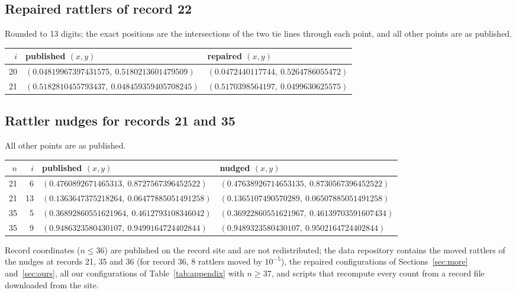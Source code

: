 \documentclass[11pt]{amsart}
\theoremstyle{definition}
\begin{document}
\subsection*{Repaired rattlers of record 22}
Rounded to 13 digits; the exact positions are the intersections of the two tie lines through each point, and all other points are as published. %
\begin{center}\small
\begin{tabular}{@{}rll@{}}
\toprule
$i$ & published $(x,y)$ & repaired $(x,y)$ \\
\midrule
20 & $(0.04819967397431575,\ 0.5180213601479509)$ & $(0.0472440117744,\ 0.5264786055472)$ \\
21 & $(0.5182810455793437,\ 0.048459359405708245)$ & $(0.5170398564197,\ 0.0499630625575)$ \\
\bottomrule
\end{tabular}
\end{center}

\subsection*{Rattler nudges for records 21 and 35}
All other points are as published. %
\begin{center}\small
\begin{tabular}{@{}rrll@{}}
\toprule
$n$ & $i$ & published $(x,y)$ & nudged $(x,y)$ \\
\midrule
21 & 6 & $(0.4760892671465313,\ 0.8727567396452522)$ & $(0.47638926714653135,\ 0.8730567396452522)$ \\
21 & 13 & $(0.1363647375218264,\ 0.06477885051491258)$ & $(0.1365107490570289,\ 0.06507885051491258)$ \\
35 & 5 & $(0.36892860551621964,\ 0.4612793108346042)$ & $(0.36922860551621967,\ 0.46139703591607434)$ \\
35 & 9 & $(0.9486323580430107,\ 0.9499164724402844)$ & $(0.9489323580430107,\ 0.9502164724402844)$ \\
\bottomrule
\end{tabular}
\end{center}
Record coordinates ($n \le 36$) are published on the record site and are not redistributed; the data repository contains the moved rattlers of the nudges at records 21, 35 and 36 (for record 36, 8 rattlers moved by $10^{-5}$), the repaired configurations of Sections~\ref{sec:more} and~\ref{sec:ours}, all our configurations of Table~\ref{tab:appendix} with $n \ge 37$, and scripts that recompute every count from a record file downloaded from the site.
\end{document}
